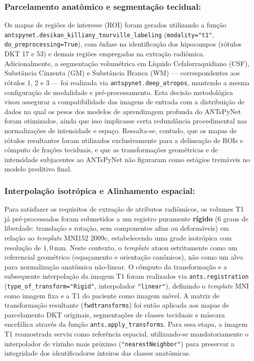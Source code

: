 \documentclass[review]{elsarticle}
\newcommand{\code}[1]{\texttt{#1}}
\begin{document}
	\subsubsection{Parcelamento anatômico e segmentação tecidual:} Os mapas de regiões de interesse (ROI) foram gerados utilizando a função \code{antspynet.desikan\_killiany\_tourville\_labeling} \cite{tustison-2021} (\code{modality="t1"}, \code{do\_preprocessing=True}), com ênfase na identificação dos hipocampos (rótulos DKT 17 e 53) e demais regiões empregadas na extração radiômica. Adicionalmente, a segmentação volumétrica em Líquido Cefalorraquidiano (CSF), Substância Cinzenta (GM) e Substância Branca (WM) — correspondentes aos rótulos 1, 2 e 3 — foi realizada via \code{antspynet.deep\_atropos}, mantendo a mesma configuração de modalidade e pré-processamento. Esta decisão metodológica visou assegurar a compatibilidade das imagens de entrada com a distribuição de dados na qual os pesos dos modelos de aprendizagem profunda do ANTsPyNet foram otimizados, ainda que isso implicasse certa redundância procedimental nas normalizações de intensidade e espaço. Ressalta-se, contudo, que os mapas de rótulos resultantes foram utilizados exclusivamente para a delineação de ROIs e cômputo de frações teciduais, e que as transformações geométricas e de intensidade subjacentes ao ANTsPyNet não figuraram como estágios treináveis no modelo preditivo final.
	
	\subsubsection{Interpolação isotrópica e Alinhamento espacial:} Para satisfazer os requisitos de extração de atributos radiômicos, os volumes T1 já pré-processados foram submetidos a um registro puramente \textbf{rígido} (6 graus de liberdade: translação e rotação, sem componentes afins ou deformáveis) em relação ao \emph{template} MNI152 2009c, estabelecendo uma grade isotrópica com resolução de \(1{,}0\)\,mm. Neste contexto, o \emph{template} atuou estritamente como um referencial geométrico (espaçamento e orientação canônicos), não como um alvo para normalização anatômica não-linear. O cômputo da transformação e a subsequente interpolação da imagem T1 foram realizados via \code{ants.registration} (\code{type\_of\_transform="Rigid"}, interpolador \code{"linear"}), definindo o \emph{template} MNI como imagem fixa e a T1 do paciente como imagem móvel. A matriz de transformação resultante (\code{fwdtransforms}) foi então aplicada aos mapas de parcelamento DKT originais, segmentações de classes teciduais e máscara encefálica  através da função \code{ants.apply\_transforms}. Para essa etapa, a imagem T1 reamostrada serviu como referência espacial, utilizando-se mandatoriamente o interpolador de vizinho mais próximo (\code{"nearestNeighbor"}) para preservar a integridade dos identificadores inteiros das classes anatômicas. 
	
\end{document}
